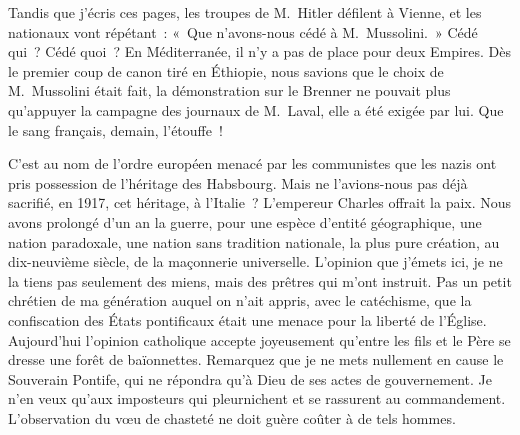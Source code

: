 \documentclass[french,twoside]{book} %
\newcommand{\astertri}{\medskip\par\centerline{\color{rubric}\large\selectfont{\syms ✻\,✻\,✻}}\medskip\par}%
\begin{document}
Tandis que j’écris ces pages, les troupes de M. Hitler défilent à Vienne, et les nationaux vont répétant : « Que n’avons-nous cédé à M. Mussolini. » Cédé qui ? Cédé quoi ? En Méditerranée, il n’y a pas de place pour deux Empires. Dès le premier coup de canon tiré en Éthiopie, nous savions que le choix de M. Mussolini était fait, la démonstration sur le Brenner ne pouvait plus qu’appuyer la campagne des journaux de M. Laval, elle a été exigée par lui. Que le sang français, demain, l’étouffe !\par
C’est au nom de l’ordre européen menacé par les communistes que les nazis ont pris possession de l’héritage des Habsbourg. Mais ne l’avions-nous pas déjà sacrifié, en 1917, cet héritage, à l’Italie ? L’empereur Charles offrait la paix. Nous avons prolongé d’un an la guerre, pour une espèce d’entité géographique, une nation paradoxale, une nation sans tradition nationale, la plus pure création, au dix-neuvième siècle, de la maçonnerie universelle. L’opinion que j’émets ici, je ne la tiens pas seulement des miens, mais des prêtres qui m’ont instruit. Pas un petit chrétien de ma génération auquel on n’ait appris, avec le catéchisme, que la confiscation des États pontificaux était une menace pour la liberté de l’Église. Aujourd’hui l’opinion catholique accepte joyeusement qu’entre les fils et le Père se dresse une forêt de baïonnettes. Remarquez que je ne mets nullement en cause le Souverain Pontife, qui ne répondra qu’à Dieu de ses actes de gouvernement. Je n’en veux qu’aux imposteurs qui pleurnichent et se rassurent au commandement. L’observation du vœu de chasteté ne doit guère coûter à de tels hommes.\par
 \par

\astertri
\end{document}
